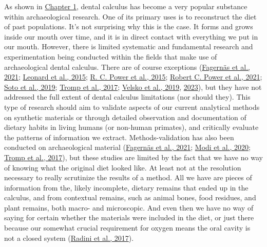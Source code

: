 \documentclass[
  b5paper,
]{book}
\begin{document}
As shown in \protect\hyperlink{fig-plot-and-wordclouds}{Chapter 1},
dental calculus has become a very popular substance within
archaeological research. One of its primary uses is to reconstruct the
diet of past populations. It's not surprising why this is the case. It
forms and grows inside our mouth over time, and it is in direct contact
with everything we put in our mouth. However, there is limited
systematic and fundamental research and experimentation being conducted
within the fields that make use of archaeological dental calculus. There
are of course exceptions
(\protect\hyperlink{ref-fagernasMicrobialBiogeography2021}{Fagernäs et
al., 2021}; \protect\hyperlink{ref-leonardPlantMicroremains2015}{Leonard
et al., 2015}; \protect\hyperlink{ref-powerChimpCalculus2015}{R. C.
Power et al., 2015};
\protect\hyperlink{ref-powerRepresentativenessDental2021}{Robert C.
Power et al., 2021};
\protect\hyperlink{ref-sotoCharacterizationDecontamination2019}{Soto et
al., 2019}; \protect\hyperlink{ref-trompEDTACalculus2017}{Tromp et al.,
2017}; \protect\hyperlink{ref-velskoMicrobialDifferences2019}{Velsko et
al., 2019}, \protect\hyperlink{ref-velskoHighConservation2023}{2023}),
but they have not addressed the full extent of dental calculus
limitations (nor should they). This type of research should aim to
validate aspects of our current analytical methods on synthetic
materials or through detailed observation and documentation of dietary
habits in living humans (or non-human primates), and critically evaluate
the patterns of information we extract. Methods-validation has also been
conducted on archaeological material
(\protect\hyperlink{ref-fagernasMicrobialBiogeography2021}{Fagernäs et
al., 2021}; \protect\hyperlink{ref-modiCalculusMethodologies2020}{Modi
et al., 2020}; \protect\hyperlink{ref-trompEDTACalculus2017}{Tromp et
al., 2017}), but these studies are limited by the fact that we have no
way of knowing what the original diet looked like. At least not at the
resolution necessary to really scrutinize the results of a method. All
we have are pieces of information from the, likely incomplete, dietary
remains that ended up in the calculus, and from contextual remains, such
as animal bones, food residues, and plant remains, both macro- and
microscopic. And even then we have no way of saying for certain whether
the materials were included in the diet, or just there because our
somewhat crucial requirement for oxygen means the oral cavity is not a
closed system (\protect\hyperlink{ref-radiniFoodPathways2017}{Radini et
al., 2017}).
\end{document}
